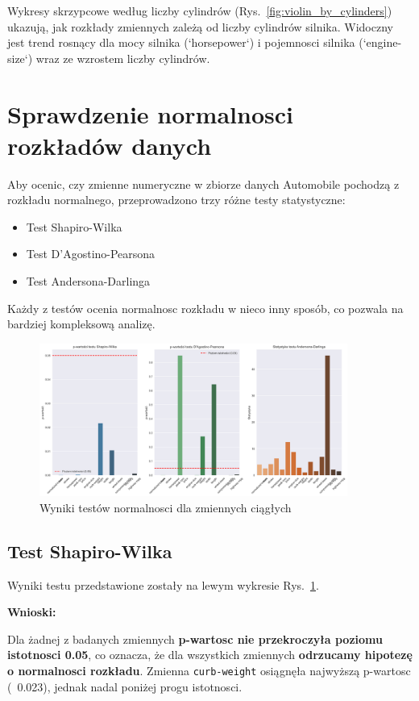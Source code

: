\documentclass[12pt,a4paper]{article}
\begin{document}
Wykresy skrzypcowe według liczby cylindrów (Rys.~\ref{fig:violin_by_cylinders}) ukazują, jak rozkłady zmiennych zależą od liczby cylindrów silnika. Widoczny jest trend rosnący dla mocy silnika (`horsepower`) i pojemnosci silnika (`engine-size`) wraz ze wzrostem liczby cylindrów.

\section{Sprawdzenie normalnosci rozkładów danych}

Aby ocenic, czy zmienne numeryczne w zbiorze danych Automobile pochodzą z rozkładu normalnego, przeprowadzono trzy różne testy statystyczne:
\begin{itemize}
    \item Test Shapiro-Wilka
    \item Test D'Agostino-Pearsona
    \item Test Andersona-Darlinga
\end{itemize}

Każdy z testów ocenia normalnosc rozkładu w nieco inny sposób, co pozwala na bardziej kompleksową analizę.

\begin{figure}[H]
    \centering
    \includegraphics[width=0.9\textwidth]{figures/normality_tests.png}
    \caption{Wyniki testów normalnosci dla zmiennych ciągłych}
    \label{fig:normality_tests}
\end{figure}

\subsection{Test Shapiro-Wilka}

Wyniki testu przedstawione zostały na lewym wykresie Rys.~\ref{fig:normality_tests}. 

\textbf{Wnioski:}

Dla żadnej z badanych zmiennych \textbf{p-wartosc nie przekroczyła poziomu istotnosci 0.05}, co oznacza, że dla wszystkich zmiennych \textbf{odrzucamy hipotezę o normalnosci rozkładu}. Zmienna \texttt{curb-weight} osiągnęła najwyższą p-wartosc (~0.023), jednak nadal poniżej progu istotnosci.
\end{document}
